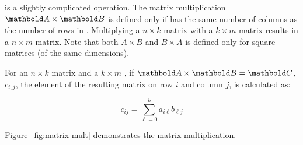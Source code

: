  is a slightly complicated operation.
The matrix multiplication $\vect{A}\times\vect{B}$ is defined only
if  has the same number of columns as the number of rows in .
Multiplying a $n\times{}k$ matrix with a $k\times{}m$ matrix
results in a $n\times{}m$ matrix.
Note that both $A\times{}B$ and $B\times{}A$ is defined only for square matrices (of the same dimensions).

For an $n\times{}k$ matrix 
and a $k\times{}m$  ,
if $\vect{A} \times \vect{B} = \vect{C}$,
$c_{i,j}$, the element of the resulting matrix  on row $i$ and column $j$,
is calculated as:

\[
  c_{ij} = \sum_{\ell=0}^{k} a_{i\ell} b_{\ell j}
\]

Figure~\ref{fig:matrix-mult} demonstrates the matrix multiplication.

